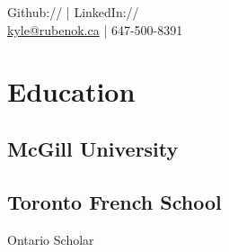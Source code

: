 \documentclass[]{deedy-resume-openfont}
\begin{document}
%
%
\lastupdated

%
%
{
Github:// \href{https://github.com/krubenok}{} | LinkedIn://  \href{https://www.linkedin.com/in/krubenok}{} \\
\href{mailto:kyle@rubenok.ca}{kyle@rubenok.ca} | 647-500-8391}

%
%

\begin{minipage}[t]{0.33\textwidth} 


\section{Education} 

\subsection{McGill University}
\sectionsep


\subsection{Toronto French School}
Ontario Scholar\\
\sectionsep




\end{minipage}
\end{document}
